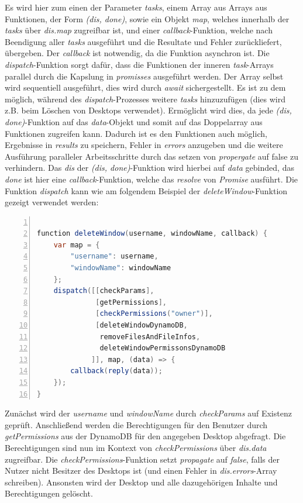 \documentclass[a4paper, 12pt]{scrreprt}
\begin{document}
Es wird hier zum einen der Parameter \textit{tasks}, einem Array aus Arrays aus Funktionen, der Form \textit{(dis, done)}, sowie ein Objekt \textit{map}, welches innerhalb der \textit{tasks} über \textit{dis.map} zugreifbar ist, und einer \textit{callback}-Funktion, welche nach Beendigung aller \textit{tasks} ausgeführt und die Resultate und Fehler zurückliefert, übergeben. Der \textit{callback} ist notwendig, da die Funktion asynchron ist. Die \textit{dispatch}-Funktion sorgt dafür, dass die Funktionen der inneren \textit{task}-Arrays parallel durch die Kapslung in \textit{promisses} ausgeführt werden. Der Array selbst wird sequentiell ausgeführt, dies wird durch \textit{await} sichergestellt. Es ist zu dem möglich, während des \textit{dispatch}-Prozesses weitere \textit{tasks} hinzuzufügen (dies wird z.B. beim Löschen von Desktops verwendet). Ermöglicht wird dies, da jede \textit{(dis, done)}-Funktion auf das \textit{data}-Objekt und somit auf das Doppelarray aus Funktionen zugreifen kann. Dadurch ist es den Funktionen auch möglich, Ergebnisse in \textit{results} zu speichern, Fehler in \textit{errors} anzugeben und die weitere Ausführung paralleler Arbeitsschritte durch das setzen von \textit{propergate} auf false zu verhindern. Das \textit{dis} der \textit{(dis, done)}-Funktion wird hierbei auf \textit{data} gebinded, das \textit{done} ist hier eine \textit{callback}-Funktion, welche das \textit{resolve} von \textit{Promise} ausführt. Die Funktion \textit{dispatch} kann wie am folgendem Beispiel der \textit{deleteWindow}-Funktion gezeigt verwendet werden:

\begin{lstlisting}[xleftmargin=\parindent,numbers=left,numberstyle=\small,numbersep=8pt,frame=L,mathescape=true, basicstyle=\small, language=Java]

function deleteWindow(username, windowName, callback) {
    var map = { 
        "username": username, 
        "windowName": windowName
    };
    dispatch([[checkParams], 
              [getPermissions], 
              [checkPermissions("owner")], 
              [deleteWindowDynamoDB, 
               removeFilesAndFileInfos, 
               deleteWindowPermissonsDynamoDB
             ]], map, (data) => {
        callback(reply(data));
    });
}
\end{lstlisting}

\noindent Zunächst wird der \textit{username} und \textit{windowName} durch \textit{checkParams} auf Existenz geprüft. Anschließend werden die Berechtigungen für den Benutzer durch \textit{getPermissions} aus der DynamoDB für den angegeben Desktop abgefragt. Die Berechtigungen sind nun im Kontext von \textit{checkPermissions} über \textit{dis.data} zugreifbar. Die \textit{checkPermissions}-Funktion setzt \textit{propagate} auf \textit{false}, falls der Nutzer nicht Besitzer des Desktops ist (und einen Fehler in \textit{dis.errors}-Array schreiben). Ansonsten wird der Desktop und alle dazugehörigen Inhalte und Berechtigungen gelöscht.    
\end{document}
